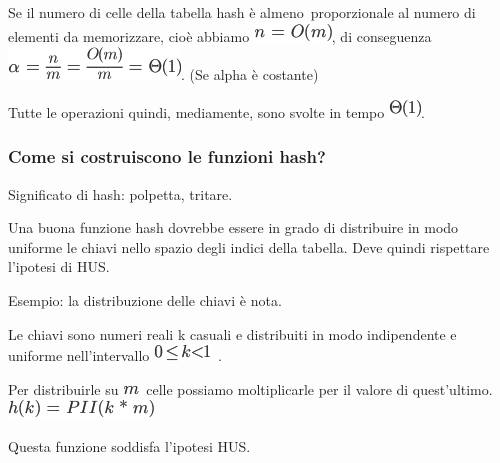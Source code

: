 \documentclass{article}
\begin{document}
{}

{Se il numero di celle della tabella hash è }{almeno}{~proporzionale al
numero di elementi da memorizzare, cioè abbiamo
}\includegraphics{images/image251.png}{, di conseguenza
}\includegraphics{images/image252.png}{. (Se alpha è costante) }

{Tutte le operazioni quindi, mediamente, sono svolte in tempo
}\includegraphics{images/image69.png}{.}

{}

\hypertarget{h.9kljpwmnt7yd}{\subsubsection{\texorpdfstring{{Come si
costruiscono le funzioni
hash?}}{Come si costruiscono le funzioni hash?}}\label{h.9kljpwmnt7yd}}

{Significato di hash: polpetta, tritare.}

{}

{Una buona funzione hash dovrebbe essere in grado di distribuire in modo
uniforme le chiavi nello spazio degli indici della tabella. Deve quindi
rispettare l'ipotesi di HUS.}

{}

{Esempio: la distribuzione delle chiavi è nota.}

{Le chiavi sono numeri reali k casuali e distribuiti in modo
indipendente e uniforme nell'intervallo
}\includegraphics{images/image253.png}{~.}

{Per distribuirle su }\includegraphics{images/image235.png}{~celle
possiamo moltiplicarle per il valore di quest'ultimo.
}\includegraphics{images/image254.png}

{Questa funzione soddisfa l'ipotesi HUS.}

{}
\end{document}
